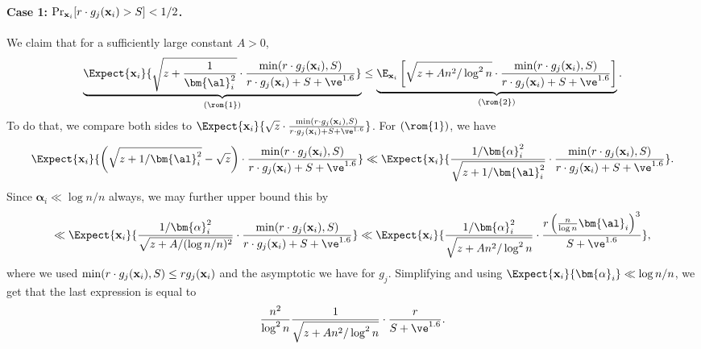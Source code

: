 	\paragraph{Case 1: $\Pr_{{\bf x}_i} [r\cdot g_j({\bf x}_i)>S] < 1/2$.}
    We claim that for a sufficiently large constant $A>0$,
		\begin{equation*}
	\underbrace{\Expect{{\bf x}_i}{\sqrt{z+\frac{1}{\bm{\al}_i^2}} \cdot\frac{\min(r\cdot g_j({\bf x}_i),S)}
	{r\cdot g_j({\bf x}_i)+S+\ve^{1.6}}}}_{(\rom{1})}
    \leq
	\underbrace{\E_{{\bf x}_i}\left[ \sqrt{z+An^2/\log^2 n} \cdot \frac{\min(r\cdot g_j({\bf x}_i),S)}
	{r\cdot g_j({\bf x}_i)+S+\ve^{1.6}}  \right]}_{(\rom{2})}
    .
	\end{equation*}
	To do that, we compare both sides to $\Expect{{\bf x}_i}{\sqrt{z} \cdot\frac{\min(r\cdot g_j({\bf x}_i),S)}{r\cdot g_j({\bf x}_i)+S+\ve^{1.6}}} $.	
	For $(\rom{1})$, we have
    \[
	\Expect{{\bf x}_i}{\left(\sqrt{z+1/\bm{\al}_i^2} -\sqrt{z}\right)\cdot \frac{\min(r\cdot g_j({\bf x}_i),S)}
	{r\cdot g_j({\bf x}_i)+S+\ve^{1.6}}}
    \ll \Expect{{\bf x}_i}{\frac{1/\bm{\alpha}_i^2}{\sqrt{z+1/\bm{\al}_i^2}}\cdot \frac{\min(r\cdot g_j({\bf x}_i),S)}
	{r\cdot g_j({\bf x}_i)+S+\ve^{1.6}}}.
	\]
    Since $\bm{\alpha}_i\ll \log n/n$ always, we may further upper bound this by
    \[
    \ll \Expect{{\bf x}_i}{\frac{1/\bm{\alpha}_i^2}{\sqrt{z+A/(\log n/n)^2}}\cdot \frac{\min(r\cdot g_j({\bf x}_i),S)}
	{r\cdot g_j({\bf x}_i)+S+\ve^{1.6}}}
    \ll \Expect{{\bf x}_i}{\frac{1/\bm{\alpha}_i^2}{\sqrt{z+An^2/\log^2 n}}\cdot \frac{r\left(\frac{n}{\log n}\bm{\al}_i\right)^3}
	{S+\ve^{1.6}}},
	\]
    where we used $\min(r\cdot g_j({\bf x}_i),S)\leq rg_j({\bf x}_i)$ and the asymptotic we have for $g_j$. Simplifying and using
    $\Expect{{\bf x}_i}{\bm{\alpha}_i}\ll \log n/n$, we get that the last expression is equal to
    \[
    \frac{n^2}{\log^2 n}\frac{1}{\sqrt{z+An^2/\log^2 n}}\cdot \frac{r}{S+\ve^{1.6}}.
    \]


